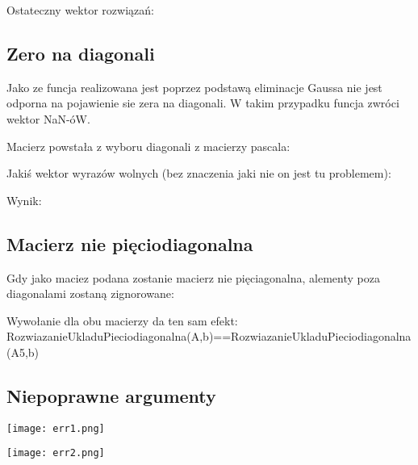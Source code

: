 \documentclass[11pt]{article}
\begin{document}
Ostateczny wektor rozwiązań:
\begin{center}
\end{center}



\subsection*{Zero na diagonali}
Jako ze funcja realizowana jest poprzez podstawą eliminacje Gaussa nie jest odporna na pojawienie sie zera na diagonali.
W takim przypadku funcja zwróci wektor NaN-óW.

Macierz powstała z wyboru diagonali z macierzy pascala:
\begin{center}
\end{center}

Jakiś wektor wyrazów wolnych (bez znaczenia jaki nie on jest tu problemem):
\begin{center}
\end{center}

Wynik:
\begin{center}
\end{center}



\subsection*{Macierz nie pięciodiagonalna}
Gdy jako maciez podana zostanie macierz nie pięciagonalna, alementy poza diagonalami zostaną zignorowane:
\begin{center}
\end{center}

Wywołanie dla obu macierzy da ten sam efekt:\\
RozwiazanieUkladuPieciodiagonalna(A,b)==RozwiazanieUkladuPieciodiagonalna(A5,b)
\begin{center}
\end{center}

\subsection*{Niepoprawne argumenty}
\begin{center}
\texttt{[image: err1.png]}
\end{center}
\begin{center}
\texttt{[image: err2.png]}
\end{center}
\end{document}
